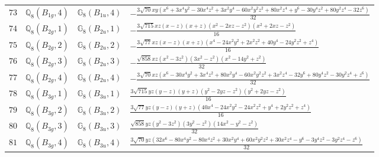 \documentclass[fleqn,8pt,landscape]{jsarticle}
\begin{document}
\begin{table}[ht!]
\begin{center}
\begin{tabular}{cccl}
$ 73 $ & $ \mathbb{Q}_{8}(B_{1g},4) $ & $ \mathbb{G}_{8}(B_{1u},4) $ & $ - \frac{3 \sqrt{70} x y \left(x^{6} + 3 x^{4} y^{2} - 30 x^{4} z^{2} + 3 x^{2} y^{4} - 60 x^{2} y^{2} z^{2} + 80 x^{2} z^{4} + y^{6} - 30 y^{4} z^{2} + 80 y^{2} z^{4} - 32 z^{6}\right)}{32} $ \\
$ 74 $ & $ \mathbb{Q}_{8}(B_{2g},1) $ & $ \mathbb{G}_{8}(B_{2u},1) $ & $ - \frac{3 \sqrt{715} x z \left(x - z\right) \left(x + z\right) \left(x^{2} - 2 x z - z^{2}\right) \left(x^{2} + 2 x z - z^{2}\right)}{16} $ \\
$ 75 $ & $ \mathbb{Q}_{8}(B_{2g},2) $ & $ \mathbb{G}_{8}(B_{2u},2) $ & $ - \frac{3 \sqrt{77} x z \left(x - z\right) \left(x + z\right) \left(x^{4} - 24 x^{2} y^{2} + 2 x^{2} z^{2} + 40 y^{4} - 24 y^{2} z^{2} + z^{4}\right)}{16} $ \\
$ 76 $ & $ \mathbb{Q}_{8}(B_{2g},3) $ & $ \mathbb{G}_{8}(B_{2u},3) $ & $ - \frac{\sqrt{858} x z \left(x^{2} - 3 z^{2}\right) \left(3 x^{2} - z^{2}\right) \left(x^{2} - 14 y^{2} + z^{2}\right)}{32} $ \\
$ 77 $ & $ \mathbb{Q}_{8}(B_{2g},4) $ & $ \mathbb{G}_{8}(B_{2u},4) $ & $ - \frac{3 \sqrt{70} x z \left(x^{6} - 30 x^{4} y^{2} + 3 x^{4} z^{2} + 80 x^{2} y^{4} - 60 x^{2} y^{2} z^{2} + 3 x^{2} z^{4} - 32 y^{6} + 80 y^{4} z^{2} - 30 y^{2} z^{4} + z^{6}\right)}{32} $ \\
$ 78 $ & $ \mathbb{Q}_{8}(B_{3g},1) $ & $ \mathbb{G}_{8}(B_{3u},1) $ & $ \frac{3 \sqrt{715} y z \left(y - z\right) \left(y + z\right) \left(y^{2} - 2 y z - z^{2}\right) \left(y^{2} + 2 y z - z^{2}\right)}{16} $ \\
$ 79 $ & $ \mathbb{Q}_{8}(B_{3g},2) $ & $ \mathbb{G}_{8}(B_{3u},2) $ & $ \frac{3 \sqrt{77} y z \left(y - z\right) \left(y + z\right) \left(40 x^{4} - 24 x^{2} y^{2} - 24 x^{2} z^{2} + y^{4} + 2 y^{2} z^{2} + z^{4}\right)}{16} $ \\
$ 80 $ & $ \mathbb{Q}_{8}(B_{3g},3) $ & $ \mathbb{G}_{8}(B_{3u},3) $ & $ \frac{\sqrt{858} y z \left(y^{2} - 3 z^{2}\right) \left(3 y^{2} - z^{2}\right) \left(14 x^{2} - y^{2} - z^{2}\right)}{32} $ \\
$ 81 $ & $ \mathbb{Q}_{8}(B_{3g},4) $ & $ \mathbb{G}_{8}(B_{3u},4) $ & $ \frac{3 \sqrt{70} y z \left(32 x^{6} - 80 x^{4} y^{2} - 80 x^{4} z^{2} + 30 x^{2} y^{4} + 60 x^{2} y^{2} z^{2} + 30 x^{2} z^{4} - y^{6} - 3 y^{4} z^{2} - 3 y^{2} z^{4} - z^{6}\right)}{32} $ \\
 \hline \hline
\end{tabular}
\end{center}
\end{table}
\end{document}
